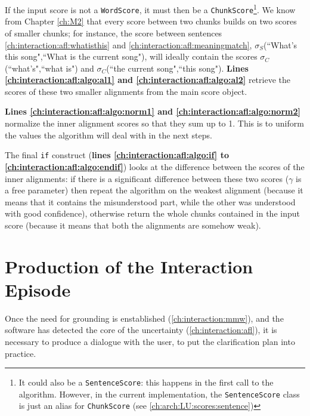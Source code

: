 If the input score is not a \texttt{WordScore}, it must then be a \texttt{ChunkScore}\footnote{It could also be a \texttt{SentenceScore}: this happens in the first call to the algorithm. However, in the current implementation, the \texttt{SentenceScore} class is just an alias for \texttt{ChunkScore} (see \ref{ch:arch:LU:scores:sentence})}. We know from Chapter \ref{ch:M2} that every score between two chunks builds on two scores of smaller chunks; for instance, the score between sentences \ref{ch:interaction:afl:whatisthis} and \ref{ch:interaction:afl:meaningmatch}, $\sigma_S$(``What's this song",``What is the current song"), will ideally contain the scores $\sigma_C$(``what's",``what is") and $\sigma_C$(``the current song",``this song"). \textbf{Lines \ref{ch:interaction:afl:algo:al1} and \ref{ch:interaction:afl:algo:al2}} retrieve the scores of these two smaller alignments from the main score object.

\textbf{Lines \ref{ch:interaction:afl:algo:norm1} and \ref{ch:interaction:afl:algo:norm2}} normalize the inner alignment scores so that they sum up to 1. This is to uniform the values the algorithm will deal with in the next steps.

The final \texttt{if} construct (\textbf{lines \ref{ch:interaction:afl:algo:if} to \ref{ch:interaction:afl:algo:endif}}) looks at the difference between the scores of the inner alignments: if there is a significant difference between these two scores ($\gamma$ is a free parameter) then repeat the algorithm on the weakest alignment (because it means that it contains the misunderstood part, while the other was understood with good confidence), otherwise return the whole chunks contained in the input score (because it means that both the alignments are somehow weak).


\section{Production of the Interaction Episode} \label{ch:interaction:episode}
Once the need for grounding is enstablished (\ref{ch:interaction:mmw}), and the software has detected the core of the uncertainty (\ref{ch:interaction:afl}), it is necessary to produce a dialogue with the user, to put the clarification plan into practice.

